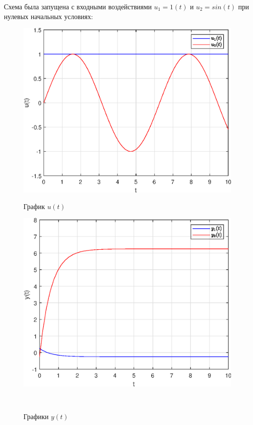 \documentclass[a4paper]{article}
\begin{document}
Схема была запущена с входными воздействиями $u_1 = 1(t)$ и $u_2 = sin(t)$ при нулевых начальных условиях:

\begin{figure}[H]
    \begin{minipage}{0.5\textwidth}
        \centering \includegraphics[width=\textwidth]{ex3/u.eps}
        \caption{График $u(t)$}
    \end{minipage}\hfill
    \begin{minipage}{0.5\textwidth}
        \centering \includegraphics[width=\textwidth]{ex3/y.eps}
        \caption{Графики $y(t)$}
    \end{minipage}\\[1em]
\end{figure}\noindent\
\end{document}
